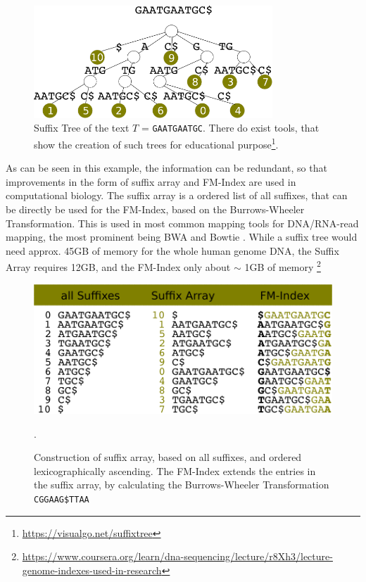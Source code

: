\begin{itemize}
\begin{figure}[!ht]
\label{fig:suffix}
    \centering
    \includegraphics[width=0.8\textwidth]{images/suffixtree.png}
    \caption[Suffix Tree of String GAATGAATGC]{Suffix Tree of the text $T$ = \texttt{GAATGAATGC}. There do exist tools, that show the creation of such trees for educational purpose\footnote{\url{https://visualgo.net/suffixtree}}.}
\end{figure}
As can be seen in this example, the information can be redundant, so that improvements in the form of suffix array and FM-Index are used in computational biology. The suffix array is a ordered list of all suffixes, that can be directly be used for the FM-Index, based on the Burrows-Wheeler Transformation. This is used in most common mapping tools for DNA/RNA-read mapping, the most prominent being BWA \cite{Li2013a,Li2009} and Bowtie \cite{Langmead2009, Langmead2012}. While a suffix tree would need approx. 45GB of memory for the whole human genome DNA, the Suffix Array requires 12GB, and the FM-Index only about $\sim$ 1GB of memory \footnote{\url{https://www.coursera.org/learn/dna-sequencing/lecture/r8Xh3/lecture-genome-indexes-used-in-research}}
\begin{figure}[!ht]
\label{fig:k-mer}
    \centering
    \includegraphics[width=1\textwidth]{images/suffix.png}
    \caption[Construction of suffix array]{Construction of suffix array, based on all suffixes, and ordered lexicographically ascending. The FM-Index extends the entries in the suffix array, by calculating the Burrows-Wheeler Transformation \texttt{CGGAAG\$TTAA}}.
\end{figure}
\end{itemize}
